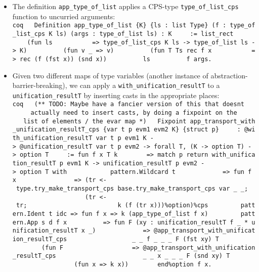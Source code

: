 \begin{itemize}
  \begin{itemize}
  \tightlist
  \item
    The definition \texttt{app\_type\_of\_list} applies a CPS-type
    \texttt{type\_of\_list\_cps} function to uncurried arguments:
    \texttt{coq\ \ \ Definition\ app\_type\_of\_list\ \{K\}\ \{ls\ :\ list\ Type\}\ (f\ :\ type\_of\_list\_cps\ K\ ls)\ (args\ :\ type\_of\_list\ ls)\ :\ K\ \ \ ~\ :=\ list\_rect\ \ \ ~\ ~\ ~\ ~(fun\ ls\ \ \ ~\ ~\ ~\ ~\ =\textgreater{}\ type\_of\_list\_cps\ K\ ls\ -\textgreater{}\ type\_of\_list\ ls\ -\textgreater{}\ K)\ \ \ ~\ ~\ ~\ ~(fun\ v\ \_\ =\textgreater{}\ v)\ \ \ ~\ ~\ ~\ ~(fun\ T\ Ts\ rec\ f\ x\ \ \ ~\ ~\ ~\ ~\ =\textgreater{}\ rec\ (f\ (fst\ x))\ (snd\ x))\ \ \ ~\ ~\ ~\ ~ls\ \ \ ~\ ~\ ~\ ~f\ args.}
  \item
    Given two different maps of type variables (another instance of
    abstraction-barrier-breaking), we can apply a
    \texttt{with\_unification\_resultT\textquotesingle{}} to a
    \texttt{unification\_resultT\textquotesingle{}} by inserting casts
    in the appropriate places:
    \texttt{coq\ \ \ (**\ TODO:\ Maybe\ have\ a\ fancier\ version\ of\ this\ that\ doesn\textquotesingle{}t\ \ \ ~\ ~\ ~actually\ need\ to\ insert\ casts,\ by\ doing\ a\ fixpoint\ on\ the\ \ \ ~\ ~\ ~list\ of\ elements\ /\ the\ evar\ map\ *)\ \ \ Fixpoint\ app\_transport\_with\_unification\_resultT\textquotesingle{}\_cps\ \{var\ t\ p\ evm1\ evm2\ K\}\ \{struct\ p\}\ \ \ ~\ :\ @with\_unification\_resultT\textquotesingle{}\ var\ t\ p\ evm1\ K\ -\textgreater{}\ @unification\_resultT\textquotesingle{}\ var\ t\ p\ evm2\ -\textgreater{}\ forall\ T,\ (K\ -\textgreater{}\ option\ T)\ -\textgreater{}\ option\ T\ \ \ ~\ :=\ fun\ f\ x\ T\ k\ \ \ ~\ ~\ ~=\textgreater{}\ match\ p\ return\ with\_unification\_resultT\textquotesingle{}\ p\ evm1\ K\ -\textgreater{}\ unification\_resultT\textquotesingle{}\ p\ evm2\ -\textgreater{}\ option\ T\ with\ \ \ ~\ ~\ ~\ ~\ \textbar{}\ pattern.Wildcard\ t\ \ \ ~\ ~\ ~\ ~\ ~\ =\textgreater{}\ fun\ f\ x\ \ \ ~\ ~\ ~\ ~\ ~\ ~\ ~=\textgreater{}\ (tr\ \textless{}-\ type.try\_make\_transport\_cps\ base.try\_make\_transport\_cps\ var\ \_\ \_;\ \ \ ~\ ~\ ~\ ~\ ~\ ~\ ~\ ~\ ~\ ~(tr\ \textless{}-\ tr;\ \ \ ~\ ~\ ~\ ~\ ~\ ~\ ~\ ~\ ~\ ~\ ~\ k\ (f\ (tr\ x)))\%option)\%cps\ \ \ ~\ ~\ ~\textbar{}\ pattern.Ident\ t\ idc\ =\textgreater{}\ fun\ f\ x\ =\textgreater{}\ k\ (app\_type\_of\_list\ f\ x)\ \ \ ~\ ~\ ~\textbar{}\ pattern.App\ s\ d\ f\ x\ \ \ ~\ ~\ ~\ ~=\textgreater{}\ fun\ F\ (xy\ :\ unification\_resultT\textquotesingle{}\ f\ \_\ *\ unification\_resultT\textquotesingle{}\ x\ \_)\ \ \ ~\ ~\ ~\ ~\ ~\ =\textgreater{}\ @app\_transport\_with\_unification\_resultT\textquotesingle{}\_cps\ \ \ ~\ ~\ ~\ ~\ ~\ ~\ ~\ ~\_\ \_\ f\ \_\ \_\ \_\ F\ (fst\ xy)\ T\ \ \ ~\ ~\ ~\ ~\ ~\ ~\ ~\ ~(fun\ F\textquotesingle{}\ \ \ ~\ ~\ ~\ ~\ ~\ ~\ ~\ ~\ =\textgreater{}\ @app\_transport\_with\_unification\_resultT\textquotesingle{}\_cps\ \ \ ~\ ~\ ~\ ~\ ~\ ~\ ~\ ~\ ~\ ~\ ~\_\ \_\ x\ \_\ \_\ \_\ F\textquotesingle{}\ (snd\ xy)\ T\ \ \ ~\ ~\ ~\ ~\ ~\ ~\ ~\ ~\ ~\ ~\ ~(fun\ x\textquotesingle{}\ =\textgreater{}\ k\ x\textquotesingle{}))\ \ \ ~\ ~\ ~end\%option\ f\ x.}

\end{itemize}
\end{itemize}
